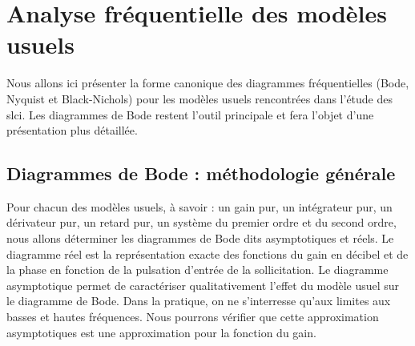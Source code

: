 \section{Analyse fréquentielle des modèles usuels}
Nous allons ici présenter la forme canonique des diagrammes fréquentielles 
(Bode, Nyquist et Black-Nichols) pour les modèles usuels rencontrées dans 
l'étude des \gls{slci}. Les diagrammes de Bode restent l'outil principale et 
fera l'objet d'une présentation plus détaillée.
\subsection{Diagrammes de Bode : méthodologie générale}
Pour chacun des modèles usuels, à savoir : un gain pur, un intégrateur pur,
un dérivateur pur, un retard pur, un système du premier ordre et du second 
ordre, nous allons déterminer les diagrammes de Bode dits asymptotiques 
et réels. Le diagramme réel est la représentation exacte des fonctions du gain
en décibel et de la phase en fonction de la pulsation d'entrée de 
la sollicitation. Le diagramme asymptotique permet de caractériser 
qualitativement l'effet du modèle usuel sur le diagramme de Bode. 
Dans la pratique, on ne s'interresse qu'aux limites aux basses et hautes 
fréquences. Nous pourrons vérifier que cette approximation asymptotiques est une
approximation pour la fonction du gain.

